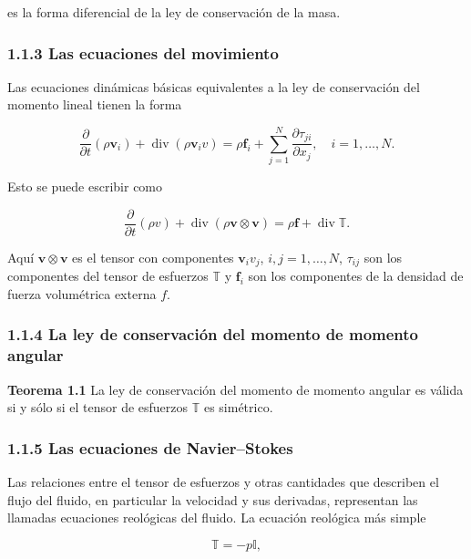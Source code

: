 \documentclass[12pt]{article}
\begin{document}
es la forma diferencial de la ley de conservación de la masa.

\subsubsection*{1.1.3 Las ecuaciones del movimiento}

Las ecuaciones dinámicas básicas equivalentes a la ley de conservación del momento lineal tienen la forma

\begin{equation}
\frac{\partial}{\partial t}(\rho \bm{v}_i) + \operatorname{div}(\rho \bm{v}_i v) = \rho \bm{f}_i + \sum_{j=1}^{N} \frac{\partial \tau_{ji}}{\partial x_j}, \quad i = 1,\dots,N.
\tag{1.1.2}
\end{equation}

Esto se puede escribir como

\begin{equation}
\frac{\partial}{\partial t}(\rho v) + \operatorname{div}(\rho \bm{v} \otimes \bm{v}) = \rho \bm{f} + \operatorname{div}\mathbb{T}.
\tag{1.1.3}
\end{equation}

Aquí $\bm{v} \otimes \bm{v}$ es el tensor con componentes $\bm{v}_i v_j$, $i,j = 1,\dots,N$, $\tau_{ij}$ son los componentes del tensor de esfuerzos $\mathbb{T}$ y $\bm{f}_i$ son los componentes de la densidad de fuerza volumétrica externa $f$.

\subsubsection*{1.1.4 La ley de conservación del momento de momento angular}

\textbf{Teorema 1.1} La ley de conservación del momento de momento angular es válida si y sólo si el tensor de esfuerzos $\mathbb{T}$ es simétrico.

\subsubsection*{1.1.5 Las ecuaciones de Navier–Stokes}

Las relaciones entre el tensor de esfuerzos y otras cantidades que describen el flujo del fluido, en particular la velocidad y sus derivadas, representan las llamadas ecuaciones reológicas del fluido. La ecuación reológica más simple

\begin{equation}
\mathbb{T} = -p\mathbb{I},
\tag{1.1.4}
\end{equation}
\end{document}
